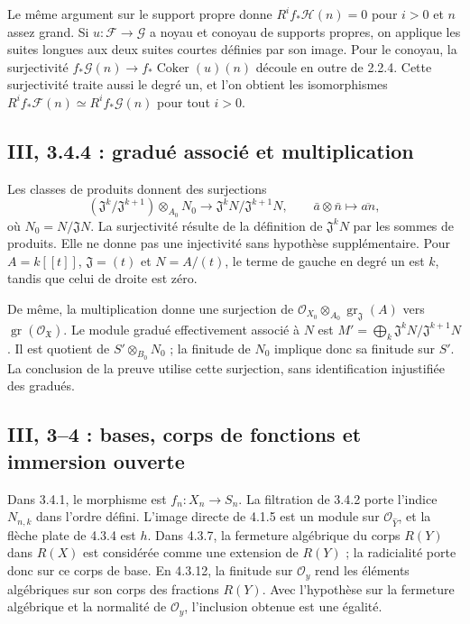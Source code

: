 \documentclass[11pt,a4paper]{article}
\begin{document}
Le même argument sur le support propre donne
$R^if_*\mathcal H(n)=0$ pour $i>0$ et $n$ assez grand.
Si $u:\mathcal F\to\mathcal G$ a noyau et conoyau de supports
propres, on applique les suites longues aux deux suites courtes
définies par son image. Pour le conoyau, la surjectivité
$f_*\mathcal G(n)\to f_*\operatorname{Coker}(u)(n)$ découle
en outre de 2.2.4. Cette surjectivité traite aussi le degré un,
et l'on obtient les isomorphismes
$R^if_*\mathcal F(n)\simeq R^if_*\mathcal G(n)$ pour tout $i>0$.

\subsection{III, 3.4.4 : gradué associé et multiplication}
\label{note:base3-associatedgraded}
Les classes de produits donnent des surjections
\[
 (\mathfrak J^k/\mathfrak J^{k+1})\otimes_{A_0}N_0
 \longrightarrow \mathfrak J^kN/\mathfrak J^{k+1}N,
 \qquad \bar a\otimes\bar n\longmapsto\overline{an},
\]
où $N_0=N/\mathfrak JN$. La surjectivité résulte de la définition
de $\mathfrak J^kN$ par les sommes de produits.
Elle ne donne pas une injectivité sans hypothèse supplémentaire.
Pour $A=k[[t]]$, $\mathfrak J=(t)$ et $N=A/(t)$, le terme
de gauche en degré un est $k$, tandis que celui de droite est zéro.

De même, la multiplication donne une surjection de
$\mathcal O_{X_0}\otimes_{A_0}\operatorname{gr}_{\mathfrak J}(A)$
vers $\operatorname{gr}(\mathcal O_{\mathfrak X})$.
Le module gradué effectivement associé à $N$ est
$M'=\bigoplus_k\mathfrak J^kN/\mathfrak J^{k+1}N$.
Il est quotient de $S'\otimes_{B_0}N_0$ ; la finitude de $N_0$
implique donc sa finitude sur $S'$. La conclusion de la preuve
utilise cette surjection, sans identification injustifiée des gradués.

\subsection{III, 3--4 : bases, corps de fonctions et immersion ouverte}
\label{note:base3-localgeometry}
Dans 3.4.1, le morphisme est $f_n:X_n\to S_n$.
La filtration de 3.4.2 porte l'indice $N_{n,k}$ dans l'ordre
défini. L'image directe de 4.1.5 est un module sur
$\mathcal O_{\widehat Y}$, et la flèche plate de 4.3.4 est $h$.
Dans 4.3.7, la fermeture algébrique du corps $R(Y)$ dans
$R(X)$ est considérée comme une extension de $R(Y)$ ; la
radicialité porte donc sur ce corps de base.
En 4.3.12, la finitude sur $\mathcal O_y$ rend les éléments
algébriques sur son corps des fractions $R(Y)$.
Avec l'hypothèse sur la fermeture algébrique et la normalité
de $\mathcal O_y$, l'inclusion obtenue est une égalité.
\end{document}
